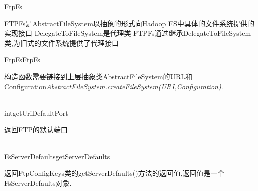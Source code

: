\begin{XeClass}{FtpFs}
   
 FTPFs是AbstractFileSystem以抽象的形式向Hadoop FS中具体的文件系统提供的实现接口
 DelegateToFileSystem是代理类
 FTPFs通过继承DelegateToFileSystem类,为旧式的文件系统提供了代理接口

  \begin{XeMethod}{}{FtpFs}{FtpFs}
       
 构造函数需要链接到上层抽象类AbstractFileSystem的URL和Configuration\emph{AbstractFileSystem.createFileSystem(URI,Configuration)}.

  \end{XeMethod}

  \begin{XeMethod}{\XeProtected\\ }{int}{getUriDefaultPort}
       
 返回FTP的默认端口

  \end{XeMethod}

  \begin{XeMethod}{\XeProtected\\ }{FsServerDefaults}{getServerDefaults}
       
 返回FtpConfigKeys类的getServerDefaults()方法的返回值,返回值是一个FsServerDefaults对象.

  \end{XeMethod}

\end{XeClass}
